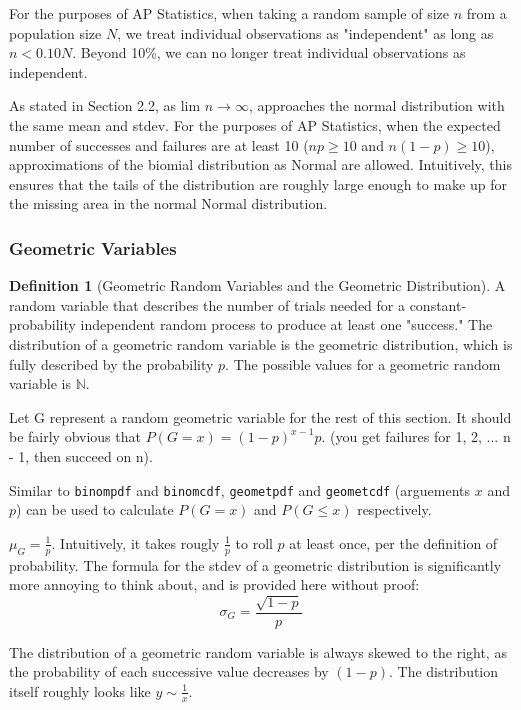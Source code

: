 \documentclass[12pt, a4paper]{article}
\theoremstyle{definition}
\newtheorem{definition}{Definition}
\begin{document}
For the purposes of AP Statistics, when taking a random sample of size $n$ from a population size $N$, we treat individual observations as "independent" as long as $n < 0.10N$.
Beyond 10\%, we can no longer treat individual observations as independent.

As stated in Section 2.2, as $\textrm{lim } n \rightarrow \infty$, approaches the normal distribution with the same mean and stdev.
For the purposes of AP Statistics, when the expected number of successes and failures are at least 10 ($np \geq 10$ and $n(1-p) \geq 10$), approximations of the biomial distribution as Normal are allowed.
Intuitively, this ensures that the tails of the distribution are roughly large enough to make up for the missing area in the normal Normal distribution.

\subsubsection{Geometric Variables}
\begin{definition}[Geometric Random Variables and the Geometric Distribution]
    A random variable that describes the number of trials needed for a constant-probability independent random process to produce at least one "success."
    The distribution of a geometric random variable is the geometric distribution, which is fully described by the probability $p$.
    The possible values for a geometric random variable is $\mathbb{N}$.
\end{definition}

Let G represent a random geometric variable for the rest of this section.
It should be fairly obvious that $P(G = x) = (1-p)^{x-1}p$. (you get failures for 1, 2, ... n - 1, then succeed on n).

Similar to \verb|binompdf| and \verb|binomcdf|, \verb|geometpdf| and \verb|geometcdf| (arguements $x$ and $p$) can be used to calculate $P(G = x)$ and $P(G \leq x)$ respectively.

$\mu_G = \frac{1}{p}$. Intuitively, it takes rougly $\frac{1}{p}$ to roll $p$ at least once, per the definition of probability.
The formula for the stdev of a geometric distribution is significantly more annoying to think about, and is provided here without proof:
\[\sigma_G = \frac{\sqrt{1 - p}}{p}\]

The distribution of a geometric random variable is always skewed to the right, as the probability of each successive value decreases by $(1 - p)$.
The distribution itself roughly looks like $y \sim \frac{1}{x}$.
\end{document}
